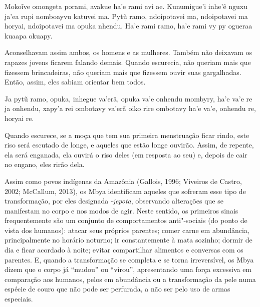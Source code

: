 \begin{paracol}{2}
\smallskip

\switchcolumn
\medskip
\noindent
Mokoĩve omongeta porami, avakue ha'e rami avi ae. Kunumigue'i inhe'ẽ
nguxu ja'ea rupi nomboayvu katuvei ma. Pytũ ramo, ndoipotavei ma,
ndoipotavei ma horyai, ndoipotavei ma opuka nhendu. Ha'e rami ramo, ha'e
rami vy py ogueraa kuaapa okuapy.

\bigskip

\switchcolumn
\noindent
Aconselhavam assim ambos, os homens e as mulheres. Também não deixavam
os rapazes jovens ficarem falando demais. Quando escurecia, não queriam
mais que fizessem brincadeiras, não queriam mais que fizessem ouvir
suas gargalhadas. Então, assim, eles sabiam orientar bem todos. 

\smallskip

\switchcolumn
\medskip
\noindent
Ja pytũ ramo, opuka, inhegue va’erã, opuka va’e onhendu mombyry, ha’e
va’e re ja onhendu, xapy’a rei ombotavy va’erã oiko rire ombotavy ha’e
va’e, onhendu re, horyai re.

\bigskip

\switchcolumn
\noindent
Quando escurece, se a moça que tem sua primeira menstruação ficar rindo,
este riso será escutado de longe, e aqueles que estão longe ouvirão.
Assim, de repente, ela será enganada, ela ouvirá o riso deles (em
resposta ao seu) e, depois de cair no engano, eles rirão
dela\footnotemark{}.
\end{paracol}

\par

\bigskip

Assim como povos indígenas da Amazônia (Gallois, 1996; Viveiros de
Castro, 2002; McCallum, 2013), os Mbya identificam aqueles que sofreram
esse tipo de transformação, por eles designada -\emph{jepota}, observando
alterações que se manifestam no corpo e nos modos de agir. Neste
sentido, os primeiros sinais frequentemente são um conjunto de
comportamentos anti"-sociais (do ponto de vista dos humanos): atacar
seus próprios parentes; comer carne em abundância, principalmente no
horário noturno; ir constantemente à mata sozinho; dormir de dia e
ficar acordado à noite; evitar compartilhar alimentos e conversas com
os parentes. E, quando a transformação se completa e se torna
irreversível, os Mbya dizem que o corpo já ``mudou'' ou ``virou'',
apresentando uma força excessiva em comparação aos humanos, pelos em
abundância ou a transformação da pele numa espécie de couro que não
pode ser perfurada, a não ser pelo uso de armas especiais. 

